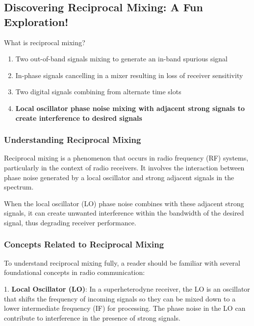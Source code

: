 \subsection{Discovering Reciprocal Mixing: A Fun Exploration!}

\begin{tcolorbox}[colback=gray!10, colframe=black, title=E4C13]
What is reciprocal mixing? 

\begin{enumerate}[label=\Alph*.]
    \item Two out-of-band signals mixing to generate an in-band spurious signal
    \item In-phase signals cancelling in a mixer resulting in loss of receiver sensitivity
    \item Two digital signals combining from alternate time slots
    \item \textbf{Local oscillator phase noise mixing with adjacent strong signals to create interference to desired signals}
\end{enumerate} \end{tcolorbox}

\subsubsection{Understanding Reciprocal Mixing}

Reciprocal mixing is a phenomenon that occurs in radio frequency (RF) systems, particularly in the context of radio receivers. It involves the interaction between phase noise generated by a local oscillator and strong adjacent signals in the spectrum. 

When the local oscillator (LO) phase noise combines with these adjacent strong signals, it can create unwanted interference within the bandwidth of the desired signal, thus degrading receiver performance.

\subsubsection{Concepts Related to Reciprocal Mixing}

To understand reciprocal mixing fully, a reader should be familiar with several foundational concepts in radio communication:

1. \textbf{Local Oscillator (LO)}: In a superheterodyne receiver, the LO is an oscillator that shifts the frequency of incoming signals so they can be mixed down to a lower intermediate frequency (IF) for processing. The phase noise in the LO can contribute to interference in the presence of strong signals.

